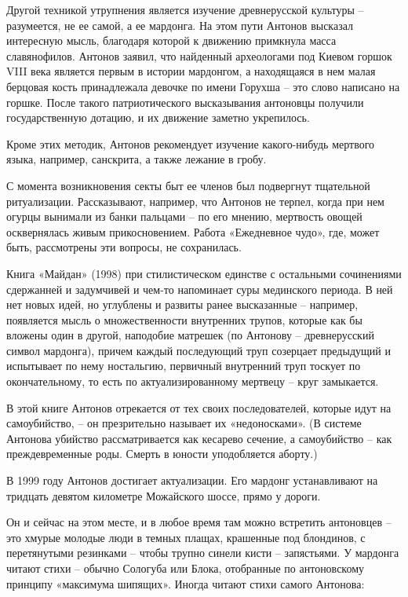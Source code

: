 \begin{pairs}
\begin{Leftside}
\beginnumbering
{\rusky
\pstart
Другой техникой утрупнения является изучение древнерусской культуры -- разумеется, не ее самой, а ее мардонга. На этом пути Антонов высказал интересную мысль, благодаря которой к движению примкнула масса славянофилов. Антонов заявил, что найденный археологами под Киевом горшок VIII века является первым в истории мардонгом, а находящаяся в нем малая берцовая кость принадлежала девочке по имени Горухша -- это слово написано на горшке. После такого патриотического высказывания антоновцы получили государственную дотацию, и их движение заметно укрепилось.
\pend

\pstart
Кроме этих методик, Антонов рекомендует изучение какого-нибудь мертвого \linebreak языка, например, санскрита, а также лежание в гробу.
\pend

\pstart
С момента возникновения секты быт ее членов был подвергнут тщательной ритуализации. Рассказывают, например, что Антонов не терпел, когда при нем огурцы вынимали из банки пальцами -- по его мнению, мертвость овощей осквернялась живым прикосновением. Работа «Ежедневное чудо», где, может быть, рассмотрены эти вопросы, не сохранилась.

Книга «Майдан» (1998) при стилистическом единстве с остальными сочинениями сдержанней и задумчивей и чем-то напоминает суры мединского периода. В ней нет новых идей, но углублены и развиты ранее высказанные -- например, появляется мысль о множественности внутренних трупов, которые как бы вложены один в другой, наподобие матрешек (по Антонову -- древнерусский символ мардонга), причем каждый последующий труп созерцает предыдущий и испытывает по нему ностальгию, первичный внутренний труп тоскует по окончательному, то есть по актуализированному мертвецу -- круг замыкается.
\pend

\pstart
В этой книге Антонов отрекается от тех своих последователей, которые идут на самоубийство, -- он презрительно называет их «недоносками». (В системе Антонова убийство рассматривается как кесарево сечение, а самоубийство -- как преждевременные роды. Смерть в юности уподобляется аборту.)
\pend

\pstart
В 1999 году Антонов достигает актуализации. Его мардонг устанавливают на тридцать девятом километре Можайского шоссе, прямо у дороги.

Он и сейчас на этом месте, и в любое время там можно встретить антоновцев -- это хмурые молодые люди в темных плащах, крашенные под блондинов, с перетянутыми резинками -- чтобы трупно синели кисти -- запястьями. У мардонга читают стихи -- обычно Сологуба или Блока, отобранные по антоновскому принципу «максимума шипящих». Иногда читают стихи самого Антонова:
\pend

}
\end{Leftside}
\end{pairs}
